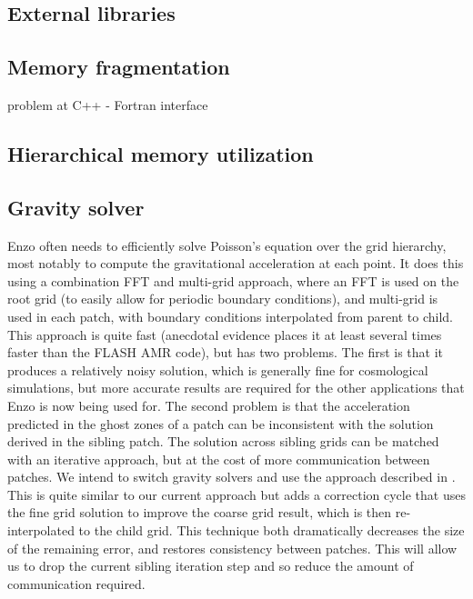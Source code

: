 \documentclass{article}
\begin{document}
\subsection{External libraries} \label{issue:libraries}
\subsection{Memory fragmentation} \label{issue:memory-fragment}
   problem at C++ - Fortran interface 
\subsection{Hierarchical memory utilization} \label{issue:memory-hierarchy-use}
\subsection{Gravity solver} \label{issue:method-gravity}

  Enzo often needs to efficiently solve Poisson's equation over the
  grid hierarchy, most notably to compute the gravitational
  acceleration at each point.  It does this using a combination FFT
  and multi-grid approach, where an FFT is used on the root grid (to
  easily allow for periodic boundary conditions), and multi-grid is
  used in each patch, with boundary conditions interpolated from
  parent to child.  This approach is quite fast (anecdotal evidence
  places it at least several times faster than the FLASH AMR code),
  but has two problems.  The first is that it produces a relatively
  noisy solution, which is generally fine for cosmological
  simulations, but more accurate results are required for the other
  applications that Enzo is now being used for.  The second problem is
  that the acceleration predicted in the ghost zones of a patch can be
  inconsistent with the solution derived in the sibling patch.  The
  solution across sibling grids can be matched with an iterative
  approach, but at the cost of more communication between patches.  We
  intend to switch gravity solvers and use the approach described in
  \cite{hg00}.  This is quite similar to our current approach but adds
  a correction cycle that uses the fine grid solution to improve the
  coarse grid result, which is then re-interpolated to the child grid.
  This technique both dramatically decreases the size of the remaining
  error, and restores consistency between patches.  This will allow us
  to drop the current sibling iteration step and so reduce the amount
  of communication required.
\end{document}
